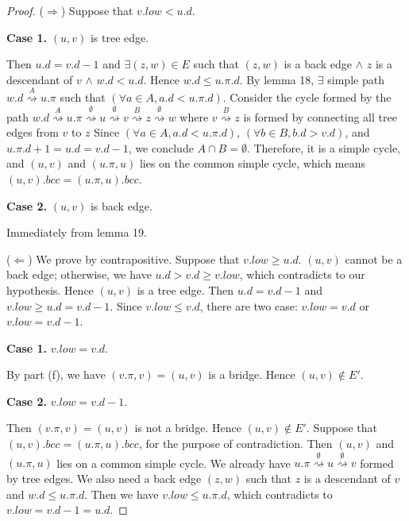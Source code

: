 \begin{proof}
    ($\Longrightarrow$)
    Suppose that $v.low < u.d$.
    
    \textbf{Case 1.}
    $(u,v)$ is tree edge.

    Then $u.d = v.d - 1$ and $\exists (z,w) \in E$ such that
    $(z,w)$ is a back edge $\wedge$ $z$ is a descendant of $v$
    $\wedge$ $w.d < u.d$.
    Hence $w.d \leq u.\pi.d$.
    By lemma 18, $\exists$ simple path
    $w.d \overset{A}{\rightsquigarrow} u.\pi$
    such that $(\forall a \in A, a.d < u.\pi.d)$.
    Consider the cycle formed by the path
    $w.d \overset{A}{\rightsquigarrow} u.\pi 
    \overset{\emptyset}{\rightsquigarrow} u 
    \overset{\emptyset}{\rightsquigarrow} v
    \overset{B}{\rightsquigarrow} z
    \overset{\emptyset}{\rightsquigarrow} w$
    where $v \overset{B}{\rightsquigarrow} z$
    is formed by connecting all tree edges from $v$ to $z$
    Since $(\forall a \in A, a.d < u.\pi.d)$,
    $(\forall b \in B, b.d > v.d)$, and $u.\pi.d + 1 = u.d = v.d - 1$,
    we conclude $A \cap B = \emptyset$.
    Therefore, it is a simple cycle, and 
    $(u,v)$ and $(u.\pi,u)$ lies on the common simple cycle,
    which means $(u,v).bcc = (u.\pi,u).bcc$.

    \textbf{Case 2.}
    $(u,v)$ is back edge.
    
    Immediately from lemma 19.

    ($\Longleftarrow$)
    We prove by contrapositive.
    Suppose that $v.low \geq u.d$.
    $(u,v)$ cannot be a back edge;
    otherwise, we have $u.d > v.d \geq v.low$,
    which contradicts to our hypothesis.
    Hence $(u,v)$ is a tree edge.
    Then $u.d = v.d - 1$ and $v.low \geq u.d = v.d - 1$.
    Since $v.low \leq v.d$, 
    there are two case: $v.low = v.d$ or $v.low = v.d - 1$.

    \textbf{Case 1.}
    $v.low = v.d$.

    By part (f), we have $(v.\pi,v) = (u,v)$ is a bridge.
    Hence $(u,v) \notin E'$.

    \textbf{Case 2.}
    $v.low = v.d - 1$.

    Then $(v.\pi,v) = (u,v)$ is not a bridge.
    Hence $(u,v) \notin E'$.
    Suppose that $(u,v).bcc = (u.\pi,u).bcc$,
    for the purpose of contradiction.
    Then $(u,v)$ and $(u.\pi,u)$ lies on a common simple cycle.
    We already have $u.\pi \overset{\emptyset}{\rightsquigarrow} u 
    \overset{\emptyset}{\rightsquigarrow} v$
    formed by tree edges.
    We also need a back edge $(z,w)$ such that
    $z$ is a descendant of $v$ and $w.d \leq u.\pi.d$.
    Then we have $v.low \leq u.\pi.d$,
    which contradicts to $v.low = v.d - 1 = u.d$.
\end{proof}

